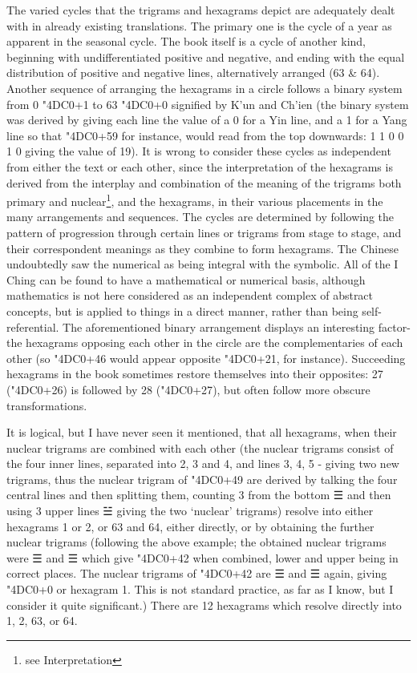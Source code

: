 \documentclass[11pt]{book}
\newcommand{\iching}[1]{{\dejavusanszh\char\numexpr"4DC0+#1}}
\begin{document}
The varied cycles that the trigrams and hexagrams depict are adequately dealt with in already existing translations. The primary one is the cycle of a year as apparent in the seasonal cycle. The book itself is a cycle of another kind, beginning with undifferentiated positive and negative, and ending with the equal distribution of positive and negative lines, alternatively arranged (63 \& 64). Another sequence of arranging the hexagrams in a circle follows a binary system from 0 \iching{1} to 63 \iching{0} signified by K'un and Ch'ien (the binary system was derived by giving each line the value of a 0 for a Yin line, and a 1 for a Yang line so that \iching{59} for instance, would read from the top downwards: 1 1 0 0 1 0 giving the value of 19). It is wrong to consider these cycles as independent from either the text or each other, since the interpretation of the hexagrams is derived from the interplay and combination of the meaning of the trigrams both primary and nuclear\footnote{see Interpretation}, and the hexagrams, in their various placements in the many arrangements and sequences. The cycles are determined by following the pattern of progression through certain lines or trigrams from stage to stage, and their correspondent meanings as they combine to form hexagrams. The Chinese undoubtedly saw the numerical as being integral with the symbolic. All of the I Ching can be found to have a mathematical or numerical basis, although mathematics is not here considered as an independent complex of abstract concepts, but is applied to things in a direct manner, rather than being self-referential. The aforementioned binary arrangement displays an interesting factor-the hexagrams opposing each other in the circle are the complementaries of each other (so \iching{46} would appear opposite \iching{21}, for instance). Succeeding hexagrams in the book sometimes restore themselves into their opposites: 27 (\iching{26}) is followed by 28 (\iching{27}), but often follow more obscure transformations.

It is logical, but I have never seen it mentioned, that all hexagrams, when their nuclear trigrams are combined with each other (the nuclear trigrams consist of the four inner lines, separated into 2, 3 and 4, and lines 3, 4, 5 - giving two new trigrams, thus the nuclear trigram of \iching{49} are derived by talking the four central lines and then splitting them, counting 3 from the bottom ☰ and then using 3 upper lines ☱ giving the two `nuclear' trigrams) resolve into either hexagrams 1 or 2, or 63 and 64, either directly, or by obtaining the further nuclear trigrams (following the above example; the obtained nuclear trigrams were ☰ and ☰ which give \iching{42} when combined, lower and upper being in correct places. The nuclear trigrams of \iching{42} are ☰ and ☰ again, giving \iching{0} or hexagram 1. This is not standard practice, as far as I know, but I consider it quite significant.) There are 12 hexagrams which resolve directly into 1, 2, 63, or 64.
\end{document}
